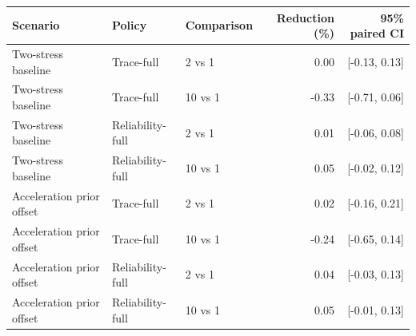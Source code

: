 \begin{tabular}{lllrr}
\toprule
Scenario & Policy & Comparison & Reduction (\%) & 95\% paired CI \\
\midrule
Two-stress baseline & Trace-full & 2 vs 1 & 0.00 & [-0.13, 0.13] \\
Two-stress baseline & Trace-full & 10 vs 1 & -0.33 & [-0.71, 0.06] \\
Two-stress baseline & Reliability-full & 2 vs 1 & 0.01 & [-0.06, 0.08] \\
Two-stress baseline & Reliability-full & 10 vs 1 & 0.05 & [-0.02, 0.12] \\
Acceleration prior offset & Trace-full & 2 vs 1 & 0.02 & [-0.16, 0.21] \\
Acceleration prior offset & Trace-full & 10 vs 1 & -0.24 & [-0.65, 0.14] \\
Acceleration prior offset & Reliability-full & 2 vs 1 & 0.04 & [-0.03, 0.13] \\
Acceleration prior offset & Reliability-full & 10 vs 1 & 0.05 & [-0.01, 0.13] \\
\bottomrule
\end{tabular}
